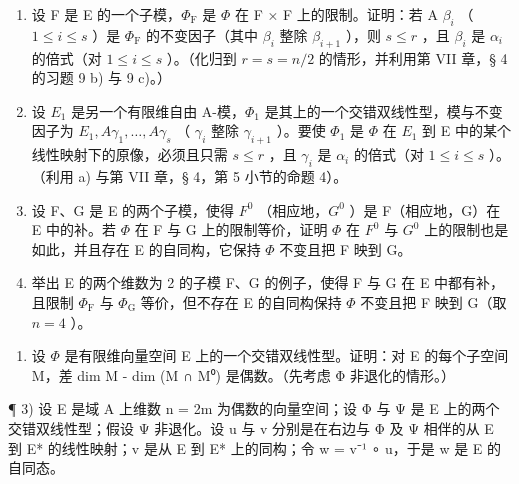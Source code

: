 \begin{enumerate}
\def\labelenumi{\alph{enumi})}
\item
  设 F 是 E 的一个子模，\(\Phi_{\mathrm{F}}\) 是 \(\Phi\) 在 F × F 上的限制。证明：若 A \(\beta_{i}\) （ \(1 \leqslant i \leqslant s\) ）是 \(\Phi_{\mathrm{F}}\) 的不变因子（其中 \(\beta_{i}\) 整除 \(\beta_{i+1}\) ），则 \(s \leqslant r\) ，且 \(\beta_{i}\) 是 \(\alpha_{i}\) 的倍式（对 \(1 \leqslant i \leqslant s\) ）。（化归到 \(r = s = n/2\) 的情形，并利用第 VII 章，§ 4 的习题 9 b) 与 9 c)。）
\item
  设 \(E_{1}\) 是另一个有限维自由 A-模，\(\Phi_{1}\) 是其上的一个交错双线性型，模与不变因子为 \(E_{1}, A\gamma_{1}, \ldots, A\gamma_{s}\) （ \(\gamma_{i}\) 整除 \(\gamma_{i+1}\) ）。要使 \(\Phi_{1}\) 是 \(\Phi\) 在 \(E_{1}\) 到 E 中的某个线性映射下的原像，必须且只需 \(s \leqslant r\) ，且 \(\gamma_{i}\) 是 \(\alpha_{i}\) 的倍式（对 \(1 \leqslant i \leqslant s\) ）。（利用 a) 与第 VII 章，§ 4，第 5 小节的命题 4）。
\item
  设 F、G 是 E 的两个子模，使得 \(F^{0}\) （相应地，\(G^{0}\) ）是 F（相应地，G）在 E 中的补。若 \(\Phi\) 在 F 与 G 上的限制等价，证明 \(\Phi\) 在 \(F^{0}\) 与 \(G^{0}\) 上的限制也是如此，并且存在 E 的自同构，它保持 \(\Phi\) 不变且把 F 映到 G。
\item
  举出 E 的两个维数为 2 的子模 F、G 的例子，使得 F 与 G 在 E 中都有补，且限制 \(\Phi_{\mathrm{F}}\) 与 \(\Phi_{\mathrm{G}}\) 等价，但不存在 E 的自同构保持 \(\Phi\) 不变且把 F 映到 G（取 \(n = 4\) ）。
\end{enumerate}

\begin{enumerate}
\def\labelenumi{\arabic{enumi})}
\setcounter{enumi}{1}
\tightlist
\item
  设 \(\Phi\) 是有限维向量空间 E 上的一个交错双线性型。证明：对 E 的每个子空间 M，差 dim M - dim (M ∩ M⁰) 是偶数。（先考虑 Φ 非退化的情形。）
\end{enumerate}

¶ 3) 设 E 是域 A 上维数 n = 2m 为偶数的向量空间；设 Φ 与 Ψ 是 E 上的两个交错双线性型；假设 Ψ 非退化。设 u 与 v 分别是在右边与 Φ 及 Ψ 相伴的从 E 到 E* 的线性映射；v 是从 E 到 E* 上的同构；令 w = v⁻¹ ∘ u，于是 w 是 E 的自同态。

